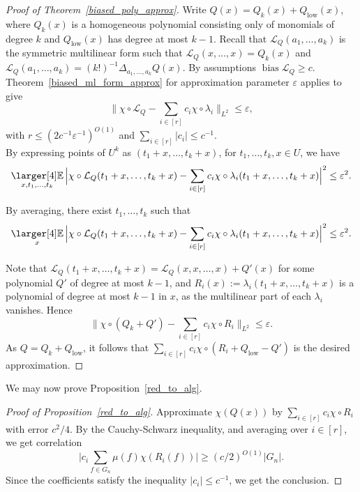 \documentclass[a4paper,11pt]{article}
\theoremstyle{definition}
\newcommand{\on}[1]{
	\operatorname{#1}
}
\newcommand{\exx}{
  \mathop{
    \mathchoice{\vcenter{\hbox{\larger[4]$\mathbb{E}$}}}
               {\kern0pt\mathbb{E}}
               {\kern0pt\mathbb{E}}
               {\kern0pt\mathbb{E}}
  }\displaylimits
}
\begin{document}
\begin{proof}[Proof of Theorem~\ref{biased_poly_approx}]
    Write $Q(x) = Q_k(x) + Q_{\on{low}}(x)$, where $Q_k(x)$ is a homogeneous polynomial consisting only of monomials of degree $k$ and $Q_{\on{low}}(x)$ has degree at most $k-1$. Recall that $\mathcal{L}_Q(a_1, \dots, a_k)$ is the symmetric multilinear form such that $\mathcal{L}_Q(x, \dots, x) = Q_k(x)$ and $\mathcal{L}_Q(a_1, \dots, a_k) = (k!)^{-1} \Delta_{a_1, \dots, a_k} Q(x)$. By assumptions $\on{bias} \mathcal{L}_Q \geq c$.\\

    Theorem~\ref{biased_ml_form_approx} for approximation parameter $\varepsilon$ applies to give
    \[\Big\| \chi \circ \mathcal{L}_Q  - \sum_{i \in [r]} c_i \chi \circ \lambda_i\Big\|_{L^2} \leq \varepsilon,\]
    with $r \leq (2c^{-1}\varepsilon^{-1})^{O(1)}$ and $\sum_{i \in [r]} |c_i| \leq c^{-1}$.\\
    
    By expressing points of $U^k$ as $(t_1 + x, \dots, t_k + x)$, for $t_1, \dots, t_k, x \in U$, we have
    \[\exx_{x, t_1, \dots, t_k} \Big|\chi \circ\mathcal{L}_Q (t_1 + x, \dots, t_k + x) - \sum_{i \in [r]} c_i \chi \circ \lambda_i(t_1 + x, \dots, t_k + x)\Big|^2 \leq \varepsilon^2.\]

    By averaging, there exist $t_1, \dots, t_k$ such that
 \[\exx_{x} \Big|\chi \circ \mathcal{L}_Q (t_1 + x, \dots, t_k + x) - \sum_{i \in [r]} c_i \chi \circ \lambda_i(t_1 + x, \dots, t_k + x)\Big|^2 \leq \varepsilon^2.\]

 Note that $\mathcal{L}_Q(t_1 + x, \dots, t_k + x) = \mathcal{L}_Q(x, x, \dots, x) + Q'(x)$ for some polynomial $Q'$ of degree at most $k - 1$, and $R_i(x) := \lambda_i(t_1 + x, \dots, t_k + x)$ is a polynomial of degree at most $k - 1$ in $x$, as the multilinear part of each $\lambda_i$ vanishes. Hence
 \[\Big\|\chi \circ (Q_k + Q') - \sum_{i \in [r]} c_i \chi \circ R_i\Big\|_{L^2} \leq \varepsilon.\]
 As $Q = Q_k + Q_{\on{low}}$, it follows that $\sum_{i \in [r]} c_i \chi \circ (R_i + Q_{\on{low}} - Q')$ is the desired approximation.
\end{proof}

We may now prove Proposition~\ref{red_to_alg}.

\begin{proof}[Proof of Proposition~\ref{red_to_alg}]
    Approximate $\chi(Q(x))$ by $\sum_{i \in [r]} c_i \chi \circ R_i$ with error $c^2/4$. By the Cauchy-Schwarz inequality, and averaging over $i \in [r]$, we get correlation
    \[\Big|c_i\sum_{f\in G_n}\mu(f)\chi(R_i(f))\Big| \geq (c/2)^{O(1)}|G_n|.\]
    Since the coefficients satisfy the inequality $|c_i| \leq c^{-1}$, we get the conclusion.
\end{proof}
\end{document}
